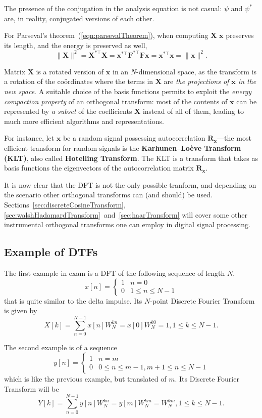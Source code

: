 \documentclass[\documentfontsize, twocolumn]{\classname}
\begin{document}
The presence of the conjugation in the analysis equation is not casual: $\psi$ and $\psi^*$ are, in reality, conjugated versions of each other.

For Parseval's theorem~(\ref{eqn:parsevalTheorem}), when computing $\bm X$ $\bm x$ preserves its length, and the energy is preserved as well,
\[
    \|\bm X\|^2 = \bm X^{*\top} \bm X = \bm x^{*\top}\bm F^{*\top} \bm {Fx} = \bm x^{*\top} \bm x = \|\bm x\|^2.
\]

Matrix $\bm X$ is a rotated version of $\bm x$ in an $N$-dimensional space, as the transform is a rotation of the co\"ordinates where the terms in $\bm X$ are \emph{the projections of $\bm x$ in the new space}. A suitable choice of the basis functions permits to exploit the \emph{energy compaction property} of an orthogonal transform: most of the contents of $\bm x$ can be represented by \emph{a subset} of the coefficients $\bm X$ instead of all of them, leading to much more efficient algorithms and representations.

For instance, let $\bm x$ be a random signal possessing autocorrelation $\bm{R_x}$---the most efficient transform for random signals is the \textbf{Karhunen--Loève Transform (KLT)}, also called \textbf{Hotelling Transform}. The KLT is a transform that takes as basis functions the eigenvectors of the autocorrelation matrix $\bm {R_x}$. 

It is now clear that the DFT is not the only possible tranform, and depending on the scenario other orthogonal transforms can (and should) be used. Sections~\ref{sec:discreteCosineTransform}, \ref{sec:walshHadamardTransform}~and~\ref{sec:haarTransform} will cover some other instrumental orthogonal transforms one can employ in digital signal processing.

\subsection{Example of DTFs}

The first example in exam is a DFT of the following sequence of length $N$,
\[
    x[n] = \left\{\begin{array}{ll}
            1 & n=0\\
            0 & 1 \leq n \leq N-1
        \end{array}\right.
\]
that is quite similar to the delta impulse. Its $N$-point Discrete Fourier Transform is given by
\[
    X[k] = \sum_{n=0}^{N-1} x[n]W_N^{kn} = x[0]W_N^{k0} = 1, 1\leq k \leq N-1.
\]

The second example is of a sequence
\[
    y[n] = \left\{\begin{array}{ll}
            1 & n=m\\
            0 & 0\leq n \leq m-1, m+1 \leq n \leq N-1
        \end{array}\right.
\]
which is like the previous example, but translated of $m$. Its Discrete Fourier Transform will be
\[
    Y[k] = \sum_{n=0}^{N-1} y[n]W_N^{kn} = y[m]W_N^{km} = W_N^{km}, 1\leq k \leq N-1.
\]
\end{document}
